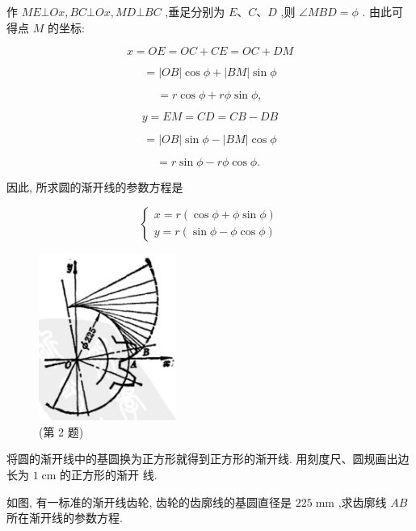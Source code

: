 \documentclass[lang=cn,newtx,10.5pt,scheme=chinese]{elegantbook}
\begin{document}
作 \({ME} \bot {Ox},{BC} \bot {Ox},{MD} \bot {BC}\) ,垂足分别为 \(E\text{、}C\text{、}D\) ,则 \(\angle {MBD} = \phi\) . 由此可得点 \(M\) 的坐标:

\[
  x = {OE} = {OC} + {CE} = {OC} + {DM}
\]

\[
  = \left| {OB}\right| \cos \phi + \left| {BM}\right| \sin \phi
\]

\[
  = r\cos \phi + {r\phi }\sin \phi ,
\]

\[
  y = {EM} = {CD} = {CB} - {DB}
\]

\[
  = \left| {OB}\right| \sin \phi - \left| {BM}\right| \cos \phi
\]

\[
  = r\sin \phi - {r\phi }\cos \phi \text{. }
\]

因此, 所求圆的渐开线的参数方程是

\[
  \left\{ \begin{array}{l} x = r\left( {\cos \phi + \phi \sin \phi }\right) \\ y = r\left( {\sin \phi - \phi \cos \phi }\right) \end{array}\right.
\]

\begin{problemset}[练习]

\item \begin{figure}[h]
  \centering
  \includegraphics[max width=0.4\textwidth]{images/01912cc2-ffb6-728e-9ae7-b113ff05c64b_168_702682.jpg}
  \caption{(第 2 题)}
\end{figure}



\item 将圆的渐开线中的基圆换为正方形就得到正方形的渐开线. 用刻度尺、圆规画出边长为 \(1\mathrm{\;{cm}}\) 的正方形的渐开 线.

\item 如图, 有一标准的渐开线齿轮, 齿轮的齿廓线的基圆直径是 \({225}\mathrm{\;{mm}}\) ,求齿廓线 \({AB}\) 所在渐开线的参数方程.

\end{problemset}
\end{document}
